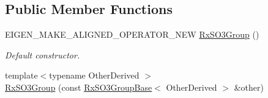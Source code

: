 \subsection*{Public Member Functions}
\begin{DoxyCompactItemize}
\item 
E\+I\+G\+E\+N\+\_\+\+M\+A\+K\+E\+\_\+\+A\+L\+I\+G\+N\+E\+D\+\_\+\+O\+P\+E\+R\+A\+T\+O\+R\+\_\+\+N\+EW \hyperlink{class_sophus_1_1_rx_s_o3_group_aa8b27095237070c5cae830e49bb9c196}{Rx\+S\+O3\+Group} ()
\begin{DoxyCompactList}\small\item\em Default constructor. \end{DoxyCompactList}\item 
{\footnotesize template$<$typename Other\+Derived $>$ }\\\hyperlink{class_sophus_1_1_rx_s_o3_group_a970f9fc29a915d8036887f2f5991420d}{Rx\+S\+O3\+Group} (const \hyperlink{class_sophus_1_1_rx_s_o3_group_base}{Rx\+S\+O3\+Group\+Base}$<$ Other\+Derived $>$ \&other)\hypertarget{class_sophus_1_1_rx_s_o3_group_a970f9fc29a915d8036887f2f5991420d}{}\label{class_sophus_1_1_rx_s_o3_group_a970f9fc29a915d8036887f2f5991420d}


\end{DoxyCompactItemize}

